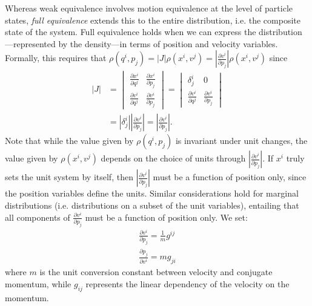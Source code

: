 \documentclass[12pt, english, twoside]{article} %
\begin{document}
Whereas weak equivalence involves motion equivalence at the level of particle states, \textit{full equivalence} extends this to the entire distribution, i.e. the composite state of the system. Full equivalence holds when we can express the distribution---represented by the density---in terms of position and velocity variables. Formally, this requires that $\rho(q^i, p_j) = |J| \rho(x^i, v^j) = \left|\frac{\partial v^i}{\partial p_j}\right| \rho(x^i, v^j)$ since
\begin{equation}
\begin{aligned}
|J| &= \begin{vmatrix}
\frac{\partial x^i}{\partial q^j} & \frac{\partial x^i}{\partial p_j} \\
\frac{\partial v^i}{\partial q^j} & \frac{\partial v^i}{\partial p_j}
\end{vmatrix}
= \begin{vmatrix}
\delta^i_j & 0 \\
\frac{\partial v^i}{\partial q^j} & \frac{\partial v^i}{\partial p_j}
\end{vmatrix} \\
&= \left|\delta^i_j\right| \left|\frac{\partial v^i}{\partial p_j}\right| 
= \left|\frac{\partial v^i}{\partial p_j}\right|.
\end{aligned}
\end{equation}
Note that while the value given by $\rho(q^i, p_j)$ is invariant under unit changes, the value given by $\rho(x^i, v^j)$ depends on the choice of units through $\left|\frac{\partial v^i}{\partial p_j}\right|$. If $x^i$ truly sets the unit system by itself, then $\left|\frac{\partial v^i}{\partial p_j}\right|$ must be a function of position only, since the position variables define the units. Similar considerations hold for marginal distributions (i.e. distributions on a subset of the unit variables), entailing that all components of $\frac{\partial v^i}{\partial p_j}$ must be a function of position only. We set:
\begin{equation}
\begin{aligned}
\frac{\partial v^i}{\partial p_j} = \frac{1}{m} g^{ij} \\
\frac{\partial p_j}{\partial v^i} = m g_{ji}
\end{aligned}
\end{equation}
where $m$ is the unit conversion constant between velocity and conjugate momentum, while $g_{ij}$ represents the linear dependency of the velocity on the momentum. 
\end{document}
